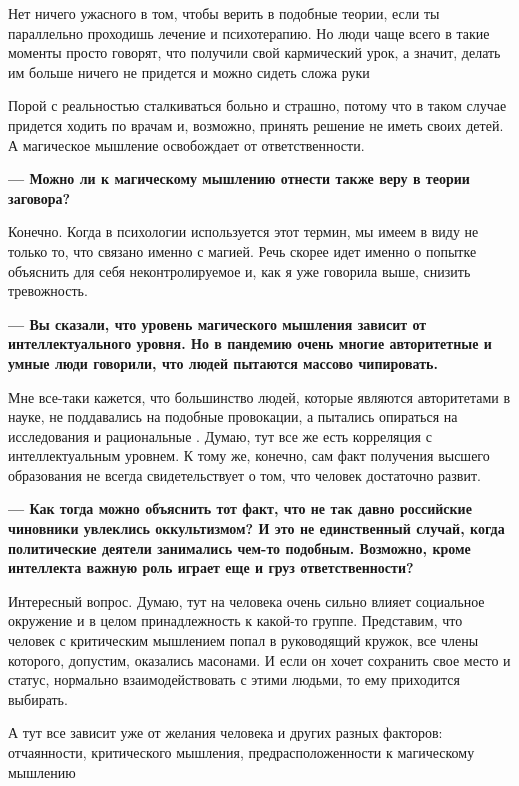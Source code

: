 \begin{fancyquotes}
    Нет ничего ужасного в том, чтобы верить в подобные теории, если ты параллельно проходишь лечение и психотерапию. Но люди чаще всего в такие моменты просто говорят, что получили свой кармический урок, а значит, делать им больше ничего не придется и можно сидеть сложа руки
\end{fancyquotes}

Порой с реальностью сталкиваться больно и страшно, потому что в таком случае придется ходить по врачам и, возможно, принять решение не иметь своих детей. А магическое мышление освобождает от ответственности.

\textbf{--- Можно ли к магическому мышлению отнести также веру в теории заговора?}

Конечно. Когда в психологии используется этот термин, мы имеем в виду не только то, что связано именно с магией. Речь скорее идет именно о попытке объяснить для себя неконтролируемое и, как я уже говорила выше, снизить тревожность.

\textbf{--- Вы сказали, что уровень магического мышления зависит от интеллектуального уровня. Но в пандемию очень многие авторитетные и умные люди говорили, что людей пытаются массово чипировать.}

Мне все-таки кажется, что большинство людей, которые являются авторитетами в науке, не поддавались на подобные провокации, а пытались опираться на исследования и рациональные . Думаю, тут все же есть корреляция с интеллектуальным уровнем. К тому же, конечно, сам факт получения высшего образования не всегда свидетельствует о том, что человек достаточно развит.

\textbf{--- Как тогда можно объяснить тот факт, что не так давно российские чиновники увлеклись оккультизмом? И это не единственный случай, когда политические деятели занимались чем-то подобным. Возможно, кроме интеллекта важную роль играет еще и груз ответственности?}

Интересный вопрос. Думаю, тут на человека очень сильно влияет социальное окружение и в целом принадлежность к какой-то группе.
Представим, что человек с критическим мышлением попал в руководящий кружок, все члены которого, допустим, оказались масонами. И если он хочет сохранить свое место и статус, нормально взаимодействовать с этими людьми, то ему приходится выбирать.

\begin{fancyquotes}
    А тут все зависит уже от желания человека и других разных факторов: отчаянности, критического мышления, предрасположенности к магическому мышлению
\end{fancyquotes}

